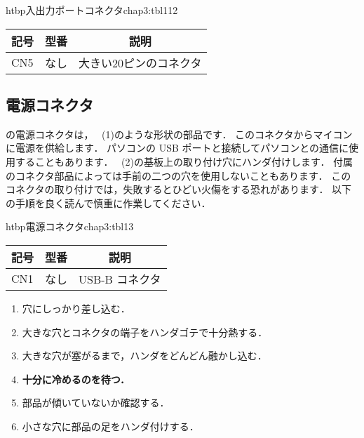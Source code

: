 \begin{mytable}{htbp}{入出力ポートコネクタ}{chap3:tbl112}
\begin{tabular}{|l|l|l|}
\hline
\multicolumn{1}{|c|}{記号} &
\multicolumn{1}{c|}{型番} &
\multicolumn{1}{c|}{説明} \\
\hline
CN5 & なし & 大きい20ピンのコネクタ \\
\hline
\end{tabular}
\end{mytable}


\subsection{電源コネクタ}

の電源コネクタは，
~(1)のような形状の部品です．
このコネクタからマイコンに電源を供給します．
パソコンの USB ポートと接続してパソコンとの通信に使用することもあります．
~(2)の基板上の取り付け穴にハンダ付けします．
付属のコネクタ部品によっては手前の二つの穴を使用しないこともあります．
このコネクタの取り付けでは，失敗するとひどい火傷をする恐れがあります．
以下の手順を良く読んで慎重に作業してください．

\begin{mytable}{htbp}{電源コネクタ}{chap3:tbl13}
\begin{tabular}{|l|l|l|}
\hline
\multicolumn{1}{|c|}{記号} &
\multicolumn{1}{c|}{型番} &
\multicolumn{1}{c|}{説明} \\
\hline
CN1 & なし & USB-B コネクタ \\
\hline
\end{tabular}
\end{mytable}


\begin{enumerate}
\item 穴にしっかり差し込む．
\item 大きな穴とコネクタの端子をハンダゴテで十分熱する．
\item 大きな穴が塞がるまで，ハンダをどんどん融かし込む．
\item {\bf 十分に冷めるのを待つ．}
\item 部品が傾いていないか確認する．
\item 小さな穴に部品の足をハンダ付けする．
\end{enumerate}

